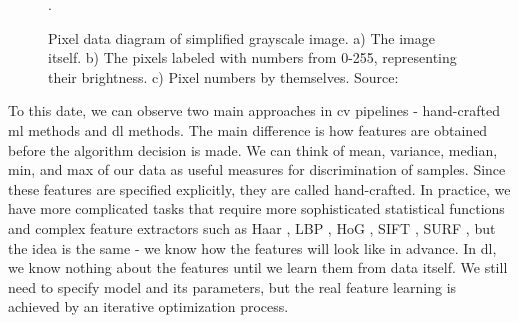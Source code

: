         \begin{figure}[h]
            \centering
            \qquad
            \qquad
            \caption{Pixel data diagram of simplified grayscale image. a) The image itself. b) The pixels labeled with numbers from 0-255, representing their brightness. c) Pixel numbers by themselves. Source: \cite{computervisiongolan}}.
            \label{fig:lincon_pixels}
        \end{figure}
        
        To this date, we can observe two main approaches in \gls{cv} pipelines - hand-crafted \gls{ml} methods and \gls{dl} methods. The main difference is how features are obtained before the algorithm decision is made. We can think of mean, variance, median, min, and max of our data as useful measures for discrimination of samples. Since these features are specified explicitly, they are called hand-crafted. In practice, we have more complicated tasks that require more sophisticated statistical functions and complex feature extractors such as Haar \cite{viola2001rapid}, LBP \cite{ojala2002multiresolution}, HoG \cite{dalal2005histograms}, SIFT \cite{lowe2004method}, SURF \cite{bay2006surf}, but the idea is the same - we know how the features will look like in advance. In \gls{dl}, we know nothing about the features until we learn them from data itself. We still need to specify model and its parameters, but the real feature learning is achieved by an iterative optimization process.
        
